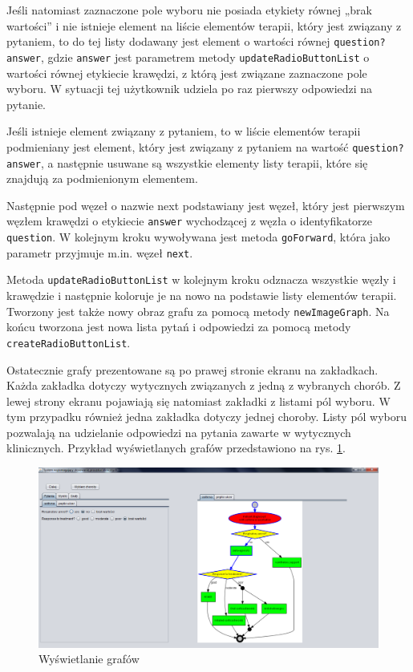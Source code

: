 Jeśli natomiast zaznaczone pole wyboru nie posiada etykiety równej „brak wartości” i nie istnieje element na liście elementów terapii, który jest związany z pytaniem, to do tej listy dodawany jest element o wartości równej \texttt{question?answer}, gdzie \texttt{answer} jest parametrem metody \texttt{updateRadioButtonList} o wartości równej etykiecie krawędzi, z którą jest związane zaznaczone pole wyboru. W sytuacji tej użytkownik udziela po raz pierwszy odpowiedzi na pytanie. 

Jeśli istnieje element związany z pytaniem, to w liście elementów terapii podmieniany jest element, który jest związany z pytaniem na wartość \texttt{question?answer}, a następnie usuwane są wszystkie elementy listy terapii, które się znajdują za podmienionym elementem. 

Następnie pod węzeł o nazwie next podstawiany jest węzeł, który jest pierwszym węzłem krawędzi o etykiecie \texttt{answer} wychodzącej z węzła o identyfikatorze \texttt{question}. W kolejnym kroku wywoływana jest metoda \texttt{goForward}, która jako parametr przyjmuje m.in. węzeł \texttt{next}. 

Metoda \texttt{updateRadioButtonList} w kolejnym kroku odznacza wszystkie węzły i krawędzie i następnie koloruje je na nowo na podstawie listy elementów terapii. Tworzony jest także nowy obraz grafu za pomocą metody \texttt{newImageGraph}. Na końcu tworzona jest nowa lista pytań i odpowiedzi za pomocą metody \texttt{createRadioButtonList}. 


Ostatecznie grafy prezentowane są po prawej stronie ekranu na zakładkach. Każda zakładka dotyczy wytycznych związanych z jedną z wybranych chorób. Z lewej strony ekranu pojawiają się natomiast zakładki z listami pól wyboru. W tym przypadku również jedna zakładka dotyczy jednej choroby. Listy pól wyboru pozwalają na udzielanie odpowiedzi na pytania zawarte w wytycznych klinicznych. Przykład wyświetlanych grafów przedstawiono na rys. \ref{fig:wyswietlanie_grafow}.
\begin{figure}[H]
\centering
\includegraphics[width=\textwidth]{img/wyswietlanie_grafow.png}
\caption{Wyświetlanie grafów}
\label{fig:wyswietlanie_grafow}
\end{figure}

